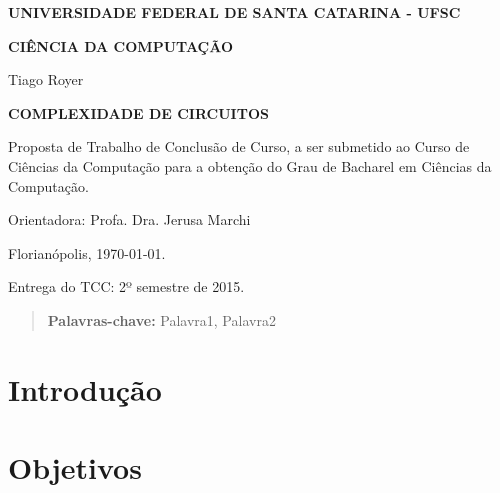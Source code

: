 \documentclass[12pt]{article}
\newcommand{\Title}[1]{\textbf{\MakeUppercase{#1}}}
\begin{document}
\begin{titlepage}
    \center

    \Title{Universidade Federal de Santa Catarina - UFSC}

    \Title{Ciência Da Computação}


    Tiago Royer


    \Title{Complexidade de Circuitos}\\[3cm]

    \begin{flushright}
        \begin{minipage}{0.5\textwidth}
            Proposta de Trabalho de Conclusão de Curso,
            a ser submetido ao Curso de Ciências da Computação
            para a obtenção do Grau de
            Bacharel em Ciências da Computação.

            Orientadora: Profa. Dra. Jerusa Marchi
        \end{minipage}
    \end{flushright}


    Florianópolis, \today.

    Entrega do TCC: 2º semestre de 2015.
\end{titlepage}


\begin{abstract}
    \blindtext

    {\bf Palavras-chave:} Palavra1, Palavra2
\end{abstract}

\newpage
\tableofcontents
\newpage


\section{Introdução}

    \blindtext\cite{Sipser2006}

    \blindtext\cite{Hastad1987}

    \blindtext\cite{Sipser2006}

\section{Objetivos}

    \blindtext[1]
\end{document}
